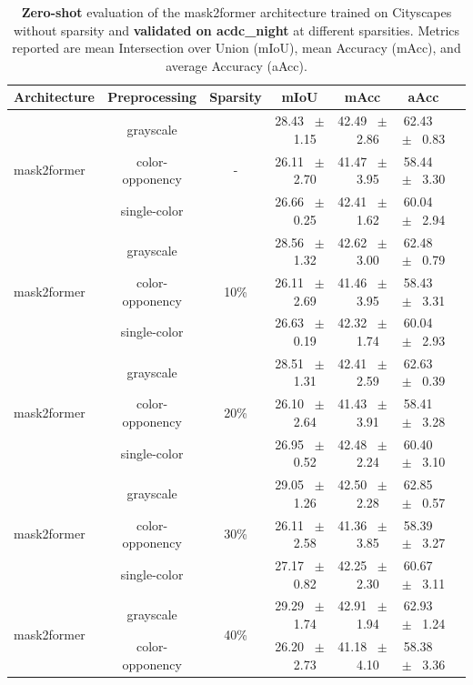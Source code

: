 \begin{table}[h]
  \centering
  \caption{\textbf{Zero-shot} evaluation of the mask2former architecture trained on Cityscapes without sparsity and \textbf{validated on acdc_night} at different sparsities. Metrics reported are mean Intersection over Union (mIoU), mean Accuracy (mAcc), and average Accuracy (aAcc).}
  \begin{tabular}{@{}lccc ccc@{}}
    \toprule
    Architecture & Preprocessing & Sparsity & mIoU & mAcc & aAcc \\
    \midrule
    \multirow{3}{*}{mask2former} & grayscale & \multirow{3}{*}{-} & 28.43 ~$\pm$~ 1.15 & 42.49 ~$\pm$~ 2.86 & 62.43 ~$\pm$~ 0.83 \\
    & color-opponency &  & 26.11 ~$\pm$~ 2.70 & 41.47 ~$\pm$~ 3.95 & 58.44 ~$\pm$~ 3.30 \\
    & single-color &  & 26.66 ~$\pm$~ 0.25 & 42.41 ~$\pm$~ 1.62 & 60.04 ~$\pm$~ 2.94 \\
    \midrule
    \multirow{3}{*}{mask2former} & grayscale & \multirow{3}{*}{10\%} & 28.56 ~$\pm$~ 1.32 & 42.62 ~$\pm$~ 3.00 & 62.48 ~$\pm$~ 0.79 \\
    & color-opponency &  & 26.11 ~$\pm$~ 2.69 & 41.46 ~$\pm$~ 3.95 & 58.43 ~$\pm$~ 3.31 \\
    & single-color &  & 26.63 ~$\pm$~ 0.19 & 42.32 ~$\pm$~ 1.74 & 60.04 ~$\pm$~ 2.93 \\
    \midrule
    \multirow{3}{*}{mask2former} & grayscale & \multirow{3}{*}{20\%} & 28.51 ~$\pm$~ 1.31 & 42.41 ~$\pm$~ 2.59 & 62.63 ~$\pm$~ 0.39 \\
    & color-opponency &  & 26.10 ~$\pm$~ 2.64 & 41.43 ~$\pm$~ 3.91 & 58.41 ~$\pm$~ 3.28 \\
    & single-color &  & 26.95 ~$\pm$~ 0.52 & 42.48 ~$\pm$~ 2.24 & 60.40 ~$\pm$~ 3.10 \\
    \midrule
    \multirow{3}{*}{mask2former} & grayscale & \multirow{3}{*}{30\%} & 29.05 ~$\pm$~ 1.26 & 42.50 ~$\pm$~ 2.28 & 62.85 ~$\pm$~ 0.57 \\
    & color-opponency &  & 26.11 ~$\pm$~ 2.58 & 41.36 ~$\pm$~ 3.85 & 58.39 ~$\pm$~ 3.27 \\
    & single-color &  & 27.17 ~$\pm$~ 0.82 & 42.25 ~$\pm$~ 2.30 & 60.67 ~$\pm$~ 3.11 \\
    \midrule
    \multirow{3}{*}{mask2former} & grayscale & \multirow{3}{*}{40\%} & 29.29 ~$\pm$~ 1.74 & 42.91 ~$\pm$~ 1.94 & 62.93 ~$\pm$~ 1.24 \\
    & color-opponency &  & 26.20 ~$\pm$~ 2.73 & 41.18 ~$\pm$~ 4.10 & 58.38 ~$\pm$~ 3.36 \\

\end{tabular}
\end{table}
